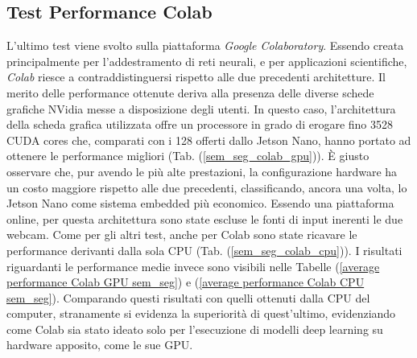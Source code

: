 \subsection{Test Performance Colab}
L'ultimo test viene svolto sulla piattaforma \emph{Google Colaboratory}. Essendo 
creata principalmente per l'addestramento di reti neurali, e per applicazioni 
scientifiche, \emph{Colab} riesce a contraddistinguersi rispetto alle due precedenti 
architetture. Il merito delle performance ottenute deriva alla presenza delle 
diverse schede grafiche NVidia messe a disposizione degli utenti. In questo caso, 
l'architettura della scheda grafica utilizzata offre un processore in 
grado di erogare fino 3528 CUDA cores che, comparati con i 128 offerti dallo 
Jetson Nano, hanno portato ad ottenere le performance migliori (Tab. (\ref{sem_seg_colab_gpu})). È 
giusto osservare che, pur avendo le più alte prestazioni, la configurazione 
hardware ha un costo maggiore rispetto alle due precedenti, classificando, 
ancora una volta, lo Jetson Nano come sistema embedded più economico. 
Essendo una piattaforma online, per questa architettura sono state escluse 
le fonti di input inerenti le due webcam. Come per gli altri test, anche per 
Colab sono state ricavare le performance derivanti dalla sola CPU (Tab. (\ref{sem_seg_colab_cpu})). 
I risultati riguardanti le performance medie invece sono visibili nelle Tabelle (\ref{average performance Colab GPU sem_seg}) e (\ref{average performance Colab CPU sem_seg}).
Comparando questi risultati con quelli ottenuti dalla CPU del computer, 
stranamente si evidenza la superiorità di quest'ultimo, evidenziando 
come Colab sia stato ideato solo per l'esecuzione di modelli deep learning su 
hardware apposito, come le sue GPU.
\newpage
